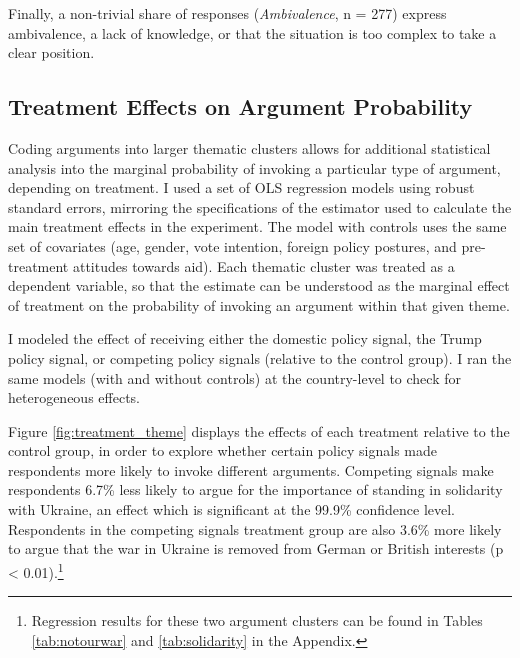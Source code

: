 Finally, a non-trivial share of responses (\textit{Ambivalence}, n = 277) express ambivalence, a lack of knowledge, or that the situation is too complex to take a clear position.

\subsection{Treatment Effects on Argument Probability}
Coding arguments into larger thematic clusters allows for additional statistical analysis into the marginal probability of invoking a particular type of argument, depending on treatment. I used a set of OLS regression models using robust standard errors, mirroring the specifications of the estimator used to calculate the main treatment effects in the experiment. The model with controls uses the same set of covariates (age, gender, vote intention, foreign policy postures, and pre-treatment attitudes towards aid). Each thematic cluster was treated as a dependent variable, so that the estimate can be understood as the marginal effect of treatment on the probability of invoking an argument within that given theme. 

I modeled the effect of receiving either the domestic policy signal, the Trump policy signal, or competing policy signals (relative to the control group). I ran the same models (with and without controls) at the country-level to check for heterogeneous effects. 


Figure \ref{fig:treatment_theme} displays the effects of each treatment relative to the control group, in order to explore whether certain policy signals made respondents more likely to invoke different arguments. Competing signals make respondents 6.7\% less likely to argue for the importance of standing in solidarity with Ukraine, an effect which is significant at the 99.9\% confidence level. Respondents in the competing signals treatment group are also 3.6\% more likely to argue that the war in Ukraine is removed from German or British interests (p < 0.01).\footnote{Regression results for these two argument clusters can be found in Tables \ref{tab:notourwar} and \ref{tab:solidarity} in the Appendix.}

